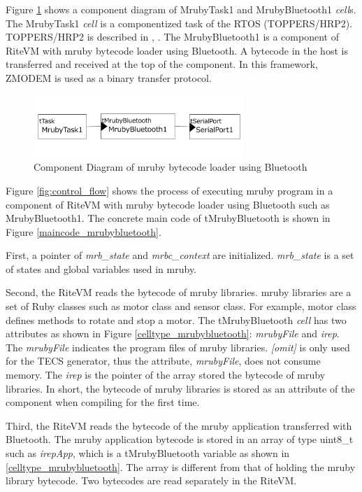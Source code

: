 \documentclass[conference,compsoc]{IEEEtran}
\begin{document}
Figure \ref{fig:component_bluetooth} shows a component diagram of MrubyTask1 and MrubyBluetooth1 {\it cell}s.
The MrubyTask1 {\it cell} is a componentized task of the RTOS (TOPPERS/HRP2).
TOPPERS/HRP2 is described in \cite{url:HRP2}, \cite{par:hr-tecs}.
The MrubyBluetooth1 is a component of RiteVM with mruby bytecode loader using Bluetooth.
A bytecode in the host is transferred and received at the top of the component.
In this framework, ZMODEM \cite{par:zmodem} is used as a binary transfer protocol.

\begin{figure}[t]
    \centering
    \includegraphics[width=8cm,clip]{figure/component_bluetooth.pdf}
    \caption{Component Diagram of mruby bytecode loader using Bluetooth}
    \label{fig:component_bluetooth}
\end{figure}

Figure \ref{fig:control_flow} shows the process of executing mruby program in a component of RiteVM with mruby bytecode loader using Bluetooth such as MrubyBluetooth1.
The concrete main code of tMrubyBluetooth is shown in Figure \ref{maincode_mrubybluetooth}.

First, a pointer of {\it mrb\_state} and {\it mrbc\_context} are initialized.
{\it mrb\_state} is a set of states and global variables used in mruby.

Second, the RiteVM reads the bytecode of mruby libraries.
mruby libraries are a set of Ruby classes such as motor class and sensor class.
For example, motor class defines methods to rotate and stop a motor.
The tMrubyBluetooth {\it cell} has two attributes as shown in Figure \ref{celltype_mrubybluetooth}: {\it mrubyFile} and {\it irep}.
The {\it mrubyFile} indicates the program files of mruby libraries.
{\it [omit]} is only used for the TECS generator, thus the attribute, {\it mrubyFile}, does not consume memory.
The {\it irep} is the pointer of the array stored the bytecode of mruby libraries.
In short, the bytecode of mruby libraries is stored as an attribute of the component when compiling for the first time.

Third, the RiteVM reads the bytecode of the mruby application transferred with Bluetooth.
The mruby application bytecode is stored in an array of type uint8\_t such as {\it irepApp}, which is a tMrubyBluetooth variable as shown in \ref{celltype_mrubybluetooth}.
The array is different from that of holding the mruby library bytecode.
Two bytecodes are read separately in the RiteVM.
\end{document}

